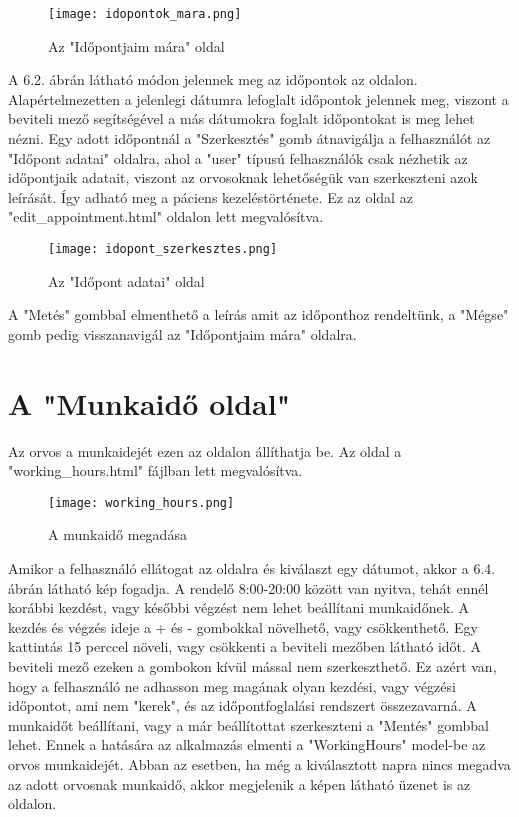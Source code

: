 \begin{figure}[H]
	\caption{Az "Időpontjaim mára" oldal}
	\label{fig:idopontjaimmara}
	\centering
	\texttt{[image: idopontok\_mara.png]}
\end{figure}

A 6.2. ábrán látható módon jelennek meg az időpontok az oldalon. Alapértelmezetten a jelenlegi dátumra lefoglalt időpontok jelennek meg, viszont a beviteli mező segítségével a más dátumokra foglalt időpontokat is meg lehet nézni. Egy adott időpontnál a "Szerkesztés" gomb átnavigálja a felhasználót az "Időpont adatai" oldalra, ahol a "user" típusú felhasználók csak nézhetik az időpontjaik adatait, viszont az orvosoknak lehetőségük van szerkeszteni azok leírását. Így adható meg a páciens kezeléstörténete. Ez az oldal az "edit\_appointment.html" oldalon lett megvalósítva.

\begin{figure}[H]
	\caption{Az "Időpont adatai" oldal}
	\label{fig:idopontadatai}
	\centering
	\texttt{[image: idopont\_szerkesztes.png]}
\end{figure}

A "Metés" gombbal elmenthető a leírás amit az időponthoz rendeltünk, a "Mégse" gomb pedig visszanavigál az "Időpontjaim mára" oldalra.

\section{A "Munkaidő oldal"}

Az orvos a munkaidejét ezen az oldalon állíthatja be. Az oldal a "working\_hours.html" fájlban lett megvalósítva.

\begin{figure}[H]
	\caption{A munkaidő megadása}
	\label{fig:munkaidomegadasa}
	\centering
	\texttt{[image: working\_hours.png]}
\end{figure}

Amikor a felhasználó ellátogat az oldalra és kiválaszt egy dátumot, akkor a 6.4. ábrán látható kép fogadja. A rendelő 8:00-20:00 között van nyitva, tehát ennél korábbi kezdést, vagy későbbi végzést nem lehet beállítani munkaidőnek. A kezdés és végzés ideje a + és - gombokkal növelhető, vagy csökkenthető. Egy kattintás 15 perccel növeli, vagy csökkenti a beviteli mezőben látható időt. A beviteli mező ezeken a gombokon kívül mással nem szerkeszthető. Ez azért van, hogy a felhasználó ne adhasson meg magának olyan kezdési, vagy végzési időpontot, ami nem "kerek", és az időpontfoglalási rendszert összezavarná. A munkaidőt beállítani, vagy a már beállítottat szerkeszteni a "Mentés" gombbal lehet. Ennek a hatására az alkalmazás elmenti a "WorkingHours" model-be az orvos munkaidejét. Abban az esetben, ha még a kiválasztott napra nincs megadva az adott orvosnak munkaidő, akkor megjelenik a képen látható üzenet is az oldalon.

